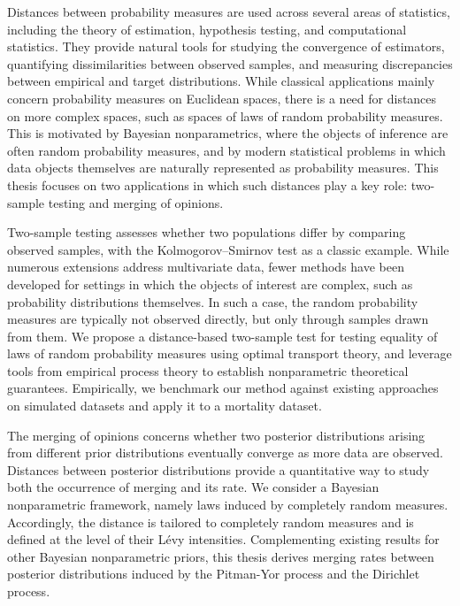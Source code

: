 Distances between probability measures are used across several areas of statistics, including the theory of estimation, hypothesis testing, and computational statistics. They provide natural tools for studying the convergence of estimators, quantifying dissimilarities between observed samples, and measuring discrepancies between empirical and target distributions. While classical applications mainly concern probability measures on Euclidean spaces, there is a need for distances on more complex spaces, such as spaces of laws of random probability measures. This is motivated by Bayesian nonparametrics, where the objects of inference are often random probability measures, and by modern statistical problems in which data objects themselves are naturally represented as probability measures. This thesis focuses on two applications in which such distances play a key role: two-sample testing and merging of opinions.

Two-sample testing assesses whether two populations differ by comparing observed samples, with the Kolmogorov–Smirnov test as a classic example. While numerous extensions address multivariate data, fewer methods have been developed for settings in which the objects of interest are complex, such as probability distributions themselves. In such a case, the random probability measures are typically not observed directly, but only through samples drawn from them. We propose a distance-based two-sample test for testing equality of laws of random probability measures using optimal transport theory, and leverage tools from empirical process theory to establish nonparametric theoretical guarantees. Empirically, we benchmark our method against existing approaches on simulated datasets and apply it to a mortality dataset.

The merging of opinions concerns whether two posterior distributions arising from different prior distributions eventually converge as more data are observed. Distances between posterior distributions provide a quantitative way to study both the occurrence of merging and its rate. We consider a Bayesian nonparametric framework, namely laws induced by completely random measures. Accordingly, the distance is tailored to completely random measures and is defined at the level of their Lévy intensities. Complementing existing results for other Bayesian nonparametric priors, this thesis derives merging rates between posterior distributions induced by the Pitman-Yor process and the Dirichlet process.
